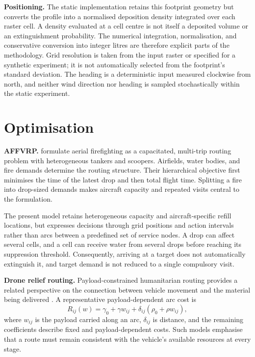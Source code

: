 \textbf{Positioning.} The static implementation retains this footprint geometry but converts the profile into a normalised deposition density integrated over each raster cell. A density evaluated at a cell centre is not itself a deposited volume or an extinguishment probability. The numerical integration, normalisation, and conservative conversion into integer litres are therefore explicit parts of the methodology. Grid resolution is taken from the input raster or specified for a synthetic experiment; it is not automatically selected from the footprint's standard deviation. The heading is a deterministic input measured clockwise from north, and neither wind direction nor heading is sampled stochastically within the static experiment.

\section{Optimisation}
\label{sec:lit-optimisation}

\textbf{AFFVRP.} \citet{chalabi2024affvrp} formulate aerial firefighting as a capacitated, multi-trip routing problem with heterogeneous tankers and scoopers. Airfields, water bodies, and fire demands determine the routing structure. Their hierarchical objective first minimises the time of the latest drop and then total flight time. Splitting a fire into drop-sized demands makes aircraft capacity and repeated visits central to the formulation.

The present model retains heterogeneous capacity and aircraft-specific refill locations, but expresses decisions through grid positions and action intervals rather than arcs between a predefined set of service nodes. A drop can affect several cells, and a cell can receive water from several drops before reaching its suppression threshold. Consequently, arriving at a target does not automatically extinguish it, and target demand is not reduced to a single compulsory visit.

\textbf{Drone relief routing.} Payload-constrained humanitarian routing provides a related perspective on the connection between vehicle movement and the material being delivered \cite{rabta2018drone}. A representative payload-dependent arc cost is
\begin{equation}
    R_{ij}(w) = \gamma_0 + \gamma w_{ij}
    + \delta_{ij}\left(\rho_0 + \rho w_{ij}\right),
\end{equation}
where $w_{ij}$ is the payload carried along an arc, $\delta_{ij}$ is distance, and the remaining coefficients describe fixed and payload-dependent costs. Such models emphasise that a route must remain consistent with the vehicle's available resources at every stage.

